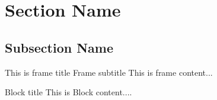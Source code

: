 \documentclass[aspectratio=169]{beamer}
\begin{document}
\section{Section Name}
\subsection{Subsection Name}
\begin{frame}
{This is frame title}
{Frame subtitle}
This is frame content...
\begin{block}{Block title}
This is Block content....
\end{block}
\end{frame}
\end{document}
